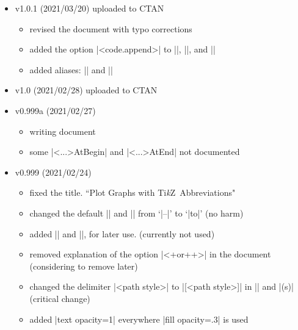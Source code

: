 \documentclass[a4paper,amsmath,chapter]{oblivoir}
\newcommand*\Tikz{Ti\textit{k}Z}
\begin{document}
\begin{itemize}
\item v1.0.1 (2021/03/20) uploaded to CTAN
  \begin{itemize}
  \item revised the document with typo corrections
  \item added the option |<code.append>| to |\tzframe|, |\tzcircle|, and |\tzellipse|
  \item added aliases: |\let\tzrectangle\tzframe| and |\let\tzoval\tzellipse|
  \end{itemize}
\item v1.0 (2021/02/28) uploaded to CTAN
\item v0.999a (2021/02/27)
  \begin{itemize}
  \item writing document
  \item some |\tz<...>AtBegin| and |\tz<...>AtEnd| not documented
  \end{itemize}
\item v0.999 (2021/02/24)
  \begin{itemize}
  \item fixed the title. ``Plot Graphs with \Tikz\ Abbreviations"
  \item changed the default |\tzpathstyle| and |\tzlinkstyle| from `|--|' to `|to|' (no harm)
  \item added |\tzpathlayer| and |\settzpathlayer|, for later use. (currently not used)
  \item removed explanation of the option |<+or++>| in the document (considering to remove later)
  \item changed the delimiter |<path style>| to |[<path style>]| in |\tzpath| and |\tzlink(s)| (critical change)
  \item added |text opacity=1| everywhere |fill opacity=.3| is used
  \end{itemize}

\end{itemize}
\end{document}
